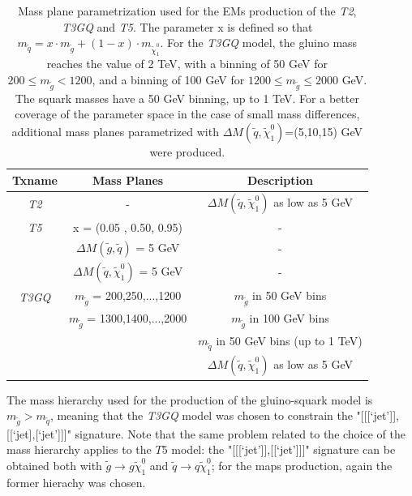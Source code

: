 \documentclass[a4paper,11pt]{article}
\begin{document}
\begin{table}[!htbp]
\footnotesize
\begin{center}
\renewcommand{\arraystretch}{1.4}
\begin{tabular}{ c c c} 
\toprule 
  \textbf{Txname} & \textbf{Mass Planes} & \textbf{Description} \\ \toprule \toprule
  \textit{T2} & - & $\Delta M(\tilde q, \tilde \chi _1 ^0)$ as low as 5 GeV \\ \midrule
  \textit{T5} & x = (0.05 , 0.50, 0.95) & - \\
       &  $\Delta M(\tilde g, \tilde q )$ = 5 GeV & - \\
       &  $\Delta M(\tilde q, \tilde \chi _1 ^0)$ = 5 GeV        & - \\ \midrule
  \textit{T3GQ}  &  $m_{\tilde g}$ = 200,250,...,1200       &  $m_{\tilde g}$ in 50 GeV bins \\ 
                 &  $m_{\tilde g}$ = 1300,1400,...,2000    &  $m_{\tilde g}$ in  100 GeV bins \\
                 &                                                                                                                  & $m_{\tilde q}$ in 50 GeV bins (up to 1 TeV) \\
                 &                                                                                                                         &  $\Delta M(\tilde q, \tilde \chi _1 ^0)$ as low as 5 GeV \\ 
\bottomrule \bottomrule
\end{tabular}
\end{center}
\caption{Mass plane parametrization used for the EMs production of the \textit{T2}, \textit{T3GQ} and \textit{T5}. The parameter x is defined so that $m_{\tilde q}= x\cdot m_{\tilde g} + (1-x)\cdot m_{\tilde \chi_1 ^0}$. For the \textit{T3GQ} model, the gluino mass reaches the value of 2 TeV, with a binning of 50 GeV for $200 \leq m_{\tilde g} < 1200$, and a binning of 100 GeV for $1200 \leq m_{\tilde g}  \leq 2000$ GeV. The squark masses have a 50 GeV binning, up to 1 TeV. For a better coverage of the parameter space in the case of small mass differences, additional mass planes parametrized with $\Delta M ( \tilde q, \tilde \chi _1 ^0)$=(5,10,15) GeV were produced. }
\label{TGQ_Planes} 
\end{table}
%
%
The mass hierarchy used for the production of the gluino-squark model is $m_{\tilde g} > m_{\tilde q}$, meaning that the \textit{T3GQ} model was chosen to constrain the "[[[`jet']],[[`jet],[`jet']]]" signature. Note that the same problem related to the choice of the mass hierarchy applies to the $T5$ model: the "[[[`jet']],[[`jet']]]" signature can be obtained both with $\tilde g \rightarrow g \tilde \chi _1 ^0$ and $\tilde q \rightarrow q \tilde \chi _1 ^0$; for the maps production, again the former hierachy was chosen. 
\end{document}
